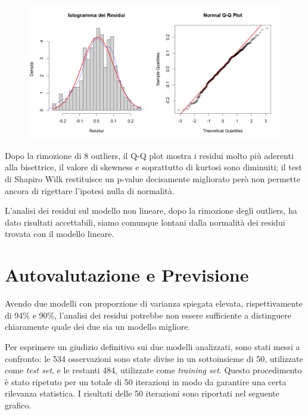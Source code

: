 \documentclass[11pt,a4paper]{article}
\begin{document}
\begin{figure}[h]
    \hspace{-1.5cm}
	\includegraphics[scale=0.75]{imgs/residuals_analysis_log_model_after_outliers_removals.png}
    \end{figure}
\vspace{-0.4cm}

Dopo la rimozione di 8 outliers, il Q-Q plot mostra i residui molto più aderenti alla bisettrice, il valore di skewness e soprattutto di kurtosi sono diminuiti;
il test di Shapiro Wilk restituisce un p-value decisamente migliorato però non permette ancora di rigettare l'ipotesi nulla di normalità.

L'analisi dei residui sul modello non lineare, dopo la rimozione degli outliers, ha dato risultati accettabili, siamo comunque lontani dalla normalità dei residui trovata con il modello lineare.

\section{Autovalutazione e Previsione}
Avendo due modelli con proporzione di varianza spiegata elevata, rispettivamente di 94\% e 90\%, l'analisi dei residui potrebbe non essere sufficiente a distinguere chiaramente quale dei due sia un modello migliore.

Per esprimere un giudizio definitivo sui due modelli analizzati, sono stati messi a confronto: le 534 osservazioni sono state divise in un sottoinsieme di 50, utilizzate come \emph{test set}, e le restanti 484, utilizzate come \emph{training set}.
Questo procedimento è stato ripetuto per un totale di 50 iterazioni in modo da garantire una certa rilevanza statistica.
I risultati delle 50 iterazioni sono riportati nel seguente grafico.
\end{document}
